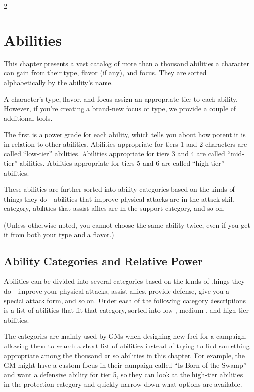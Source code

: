 \begin{multicols}{2}

\chapter{Abilities}

This chapter presents a vast catalog of more than a thousand abilities a character can gain from their type, flavor (if any), and focus. They are sorted alphabetically by the ability’s name. 

A character’s type, flavor, and focus assign an appropriate tier to each ability. However, if you’re creating a brand-new focus or type, we provide a couple of additional tools.

The first is a power grade for each ability, which tells you about how potent it is in relation to other abilities. Abilities appropriate for tiers 1 and 2 characters are called “low-tier” abilities. Abilities appropriate for tiers 3 and 4 are called “mid-tier” abilities. Abilities appropriate for tiers 5 and 6 are called “high-tier” abilities. 

These abilities are further sorted into ability categories based on the kinds of things they do—abilities that improve physical attacks are in the attack skill category, abilities that assist allies are in the support category, and so on.

(Unless otherwise noted, you cannot choose the same ability twice, even if you get it from both your type and a flavor.)

\section{Ability Categories and Relative Power}

Abilities can be divided into several categories based on the kinds of things they do—improve your physical attacks, assist allies, provide defense, give you a special attack form, and so on. Under each of the following category descriptions is a list of abilities that fit that category, sorted into low-, medium-, and high-tier abilities.

The categories are mainly used by GMs when designing new foci for a campaign, allowing them to search a short list of abilities instead of trying to find something appropriate among the thousand or so abilities in this chapter. For example, the GM might have a custom focus in their campaign called “Is Born of the Swamp” and want a defensive ability for tier 5, so they can look at the high-tier abilities in the protection category and quickly narrow down what options are available.


\end{multicols}
